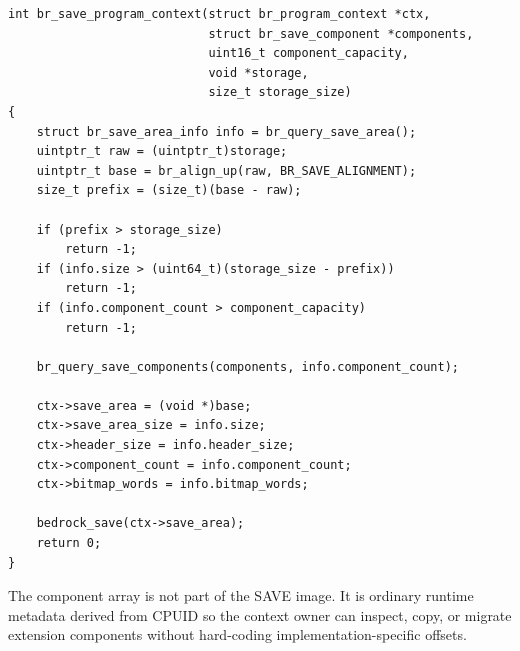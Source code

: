 \begin{verbatim}
int br_save_program_context(struct br_program_context *ctx,
                            struct br_save_component *components,
                            uint16_t component_capacity,
                            void *storage,
                            size_t storage_size)
{
    struct br_save_area_info info = br_query_save_area();
    uintptr_t raw = (uintptr_t)storage;
    uintptr_t base = br_align_up(raw, BR_SAVE_ALIGNMENT);
    size_t prefix = (size_t)(base - raw);

    if (prefix > storage_size)
        return -1;
    if (info.size > (uint64_t)(storage_size - prefix))
        return -1;
    if (info.component_count > component_capacity)
        return -1;

    br_query_save_components(components, info.component_count);

    ctx->save_area = (void *)base;
    ctx->save_area_size = info.size;
    ctx->header_size = info.header_size;
    ctx->component_count = info.component_count;
    ctx->bitmap_words = info.bitmap_words;

    bedrock_save(ctx->save_area);
    return 0;
}
\end{verbatim}
\endgroup\par

The component array is not part of the SAVE image. It is ordinary runtime metadata
derived from CPUID so the context owner can inspect, copy, or migrate extension
components without hard-coding implementation-specific offsets.

